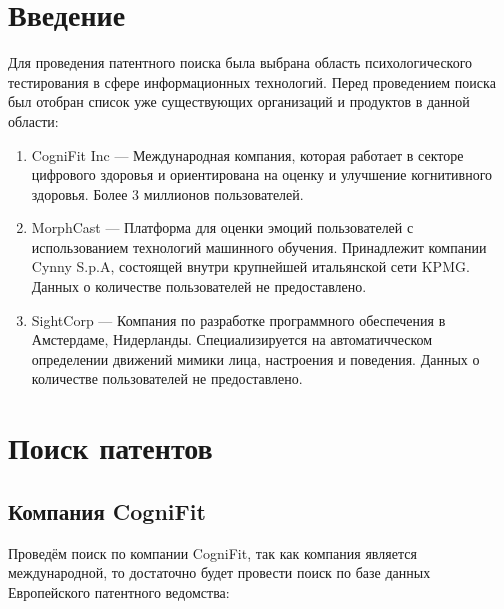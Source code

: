 \documentclass[12pt]{article}
\begin{document}
    \newpage
    \pagestyle{plain}
    \setcounter{page}{1}

    \newpage
    \tableofcontents

    \newpage
    \section{Введение}

    Для проведения патентного поиска была выбрана область психологического тестирования в сфере информационных технологий.
    Перед проведением поиска был отобран список уже существующих организаций и продуктов в данной области:

    \begin{enumerate}
        \item CogniFit Inc --- Международная компания, которая работает в секторе цифрового здоровья и ориентирована на оценку и улучшение когнитивного здоровья.
        Более 3 миллионов пользователей.
        \item MorphCast --- Платформа для оценки эмоций пользователей с использованием технологий машинного обучения.
        Принадлежит компании Cynny S.p.A, состоящей внутри крупнейшей итальянской сети KPMG.
        Данных о количестве пользователей не предоставлено.
        \item SightCorp --- Компания по разработке программного обеспечения в Амстердаме, Нидерланды.
        Специализируется на автоматичческом определении движений мимики лица, настроения и поведения.
        Данных о количестве пользователей не предоставлено.
    \end{enumerate}

    \newpage

    \section{Поиск патентов}

    \subsection{Компания CogniFit}

    Проведём поиск по компании CogniFit, так как компания является международной, то достаточно будет провести поиск по базе данных Европейского патентного ведомства:
\end{document}
